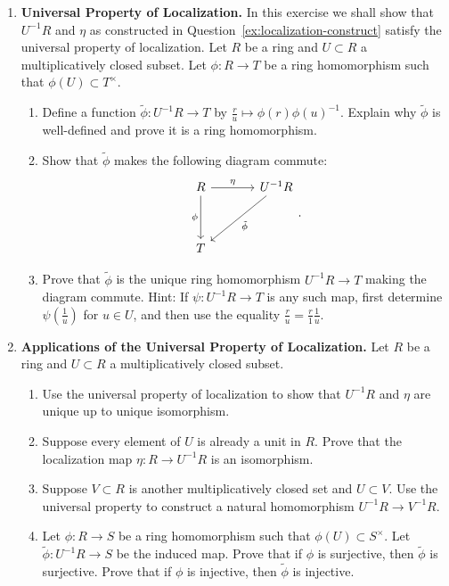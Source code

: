 \documentclass[12pt,reqno]{amsart}
\begin{document}
\begin{enumerate}[leftmargin=*]
\item \textbf{Universal Property of Localization.} In this exercise we shall show that $U^{-1}R$ and $\eta$ as constructed in Question~\ref{ex:localization-construct} satisfy the universal property of localization. Let $R$ be a ring and $U \subset R$ a multiplicatively closed subset. Let $\phi:R \to T$ be a ring homomorphism such that $\phi(U) \subset T^{\times}$.
\begin{enumerate}
	\item Define a function $\tilde{\phi}:U^{-1}R \to T$ by $\frac{r}{u}\mapsto \phi(r)\phi(u)^{-1}$. Explain why $\tilde{\phi}$ is well-defined and prove it is a ring homomorphism. 
	\item Show that $\tilde{\phi}$ makes the following diagram commute:
	\[
	\begin{tikzcd}[row sep = 3.5em, column sep = 3.5em]
	R \arrow[r, "\eta"] \arrow[d, swap, "\phi"] & U^{-1}R \arrow[dl, "\tilde{\phi}"] \\
	T  & 
	\end{tikzcd}.
	\]
	\item Prove that $\tilde{\phi}$ is the unique ring homomorphism $U^{-1}R\to T$ making the diagram commute. Hint: If $\psi:U^{-1}R\to T$ is any such map, first determine $\psi\left(\frac{1}{u}\right)$ for $u\in U$, and then use the equality $\frac{r}{u}=\frac{r}{1}\frac{1}{u}$.
\end{enumerate}

\item \textbf{Applications of the Universal Property of Localization.} Let $R$ be a ring and $U \subset R$ a multiplicatively closed subset. 
\begin{enumerate}
	\item Use the universal property of localization to show that $U^{-1}R$ and $\eta$ are unique up to unique isomorphism.
	\item Suppose every element of $U$ is already a unit in $R$. Prove that the localization map $\eta:R\to U^{-1}R$ is an isomorphism.
	\item Suppose $V\subset R$ is another multiplicatively closed set and $U\subset V$. Use the universal property to construct a natural homomorphism $U^{-1}R\to V^{-1}R$. 
	\item Let $\phi:R\to S$ be a ring homomorphism such that $\phi(U)\subset S^{\times}$. Let $\tilde{\phi}:U^{-1}R\to S$ be the induced map. Prove that if $\phi$ is surjective, then $\tilde{\phi}$ is surjective. Prove that if $\phi$ is injective, then $\tilde{\phi}$ is injective.
\end{enumerate} 

\end{enumerate}
\end{document}
